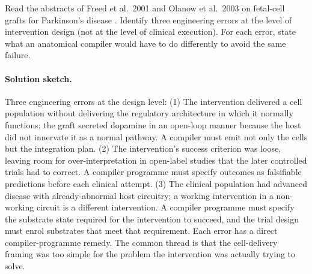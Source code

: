 \begin{exercise}
Read the abstracts of Freed et al.\ 2001 and Olanow et al.\ 2003 on
fetal-cell grafts for Parkinson's disease
\cite{paper:v6c13-freed-fetal-parkinson-2001,
paper:v6c13-olanow-fetal-parkinson-2003}. Identify three engineering
errors at the level of intervention design (not at the level of
clinical execution). For each error, state what an anatomical
compiler would have to do differently to avoid the same failure.

\paragraph{Solution sketch.}
Three engineering errors at the design level: (1) The intervention
delivered a cell population without delivering the regulatory
architecture in which it normally functions; the graft secreted
dopamine in an open-loop manner because the host did not innervate
it as a normal pathway. A compiler must emit not only the cells but
the integration plan. (2) The intervention's success criterion was
loose, leaving room for over-interpretation in open-label studies
that the later controlled trials had to correct. A compiler programme
must specify outcomes as falsifiable predictions before each clinical
attempt. (3) The clinical population had advanced disease with
already-abnormal host circuitry; a working intervention in a
non-working circuit is a different intervention. A compiler programme
must specify the substrate state required for the intervention to
succeed, and the trial design must enrol substrates that meet that
requirement. Each error has a direct compiler-programme remedy. The
common thread is that the cell-delivery framing was too simple for the
problem the intervention was actually trying to solve.
\end{exercise}

